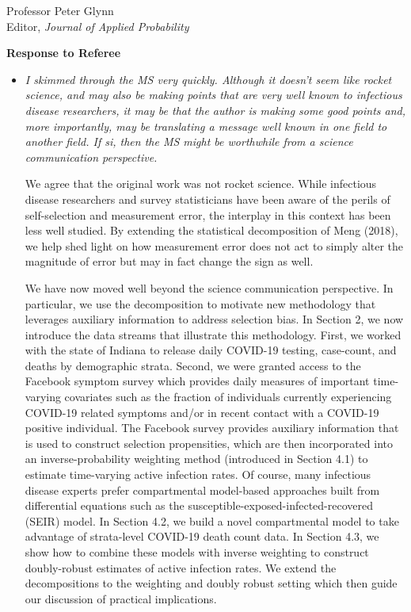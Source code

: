 \documentclass[11pt]{letter} %
\begin{document}
\begin{letter}{Professor
	Peter Glynn\\
	Editor, {\em Journal of Applied Probability}}
\begin{itemize}
\end{itemize}
\newpage

{\bf Response to Referee}
\begin{itemize}
\item {\it I skimmed through the MS very quickly. Although it doesn’t seem like rocket science, and may also be making points that are very well known to infectious disease researchers, it may be that the author is making some good points and, more importantly, may be translating a message well known in one field to another field. If si, then the MS might be worthwhile from a science communication perspective.}

\vspace{5mm}
We agree that the original work was not rocket science. While infectious disease researchers and survey statisticians have been aware of the perils of self-selection and measurement error, the interplay in this context has been less well studied.  By extending the statistical decomposition of Meng (2018), we help shed light on how measurement error does not act to simply alter the magnitude of error but may in fact change the sign as well.
\vspace{5mm}

We have now moved well beyond the science communication perspective.  In particular, we use the decomposition to motivate new methodology that leverages auxiliary information to address selection bias. In Section 2, we now introduce the data streams that illustrate this methodology. First, we worked with the state of Indiana to release daily COVID-19 testing, case-count, and deaths by demographic strata. Second, we were granted access to the Facebook symptom survey which provides daily measures of important time-varying covariates such as the fraction of individuals currently experiencing COVID-19 related symptoms and/or in recent contact with a COVID-19 positive individual.  The Facebook survey provides auxiliary information that is used to construct selection propensities, which are then incorporated into an inverse-probability weighting method (introduced in Section 4.1) to estimate time-varying active infection rates.  Of course, many infectious disease experts prefer compartmental model-based approaches built from differential equations such as the susceptible-exposed-infected-recovered (SEIR) model.  In Section 4.2, we build a novel compartmental model to take advantage of strata-level COVID-19 death count data.  In Section 4.3, we show how to combine these models with inverse weighting to construct doubly-robust estimates of active infection rates.  We extend the decompositions to the weighting and doubly robust setting which then guide our discussion of practical implications.
\vspace{5mm}


\end{itemize}
\end{letter}
\end{document}
